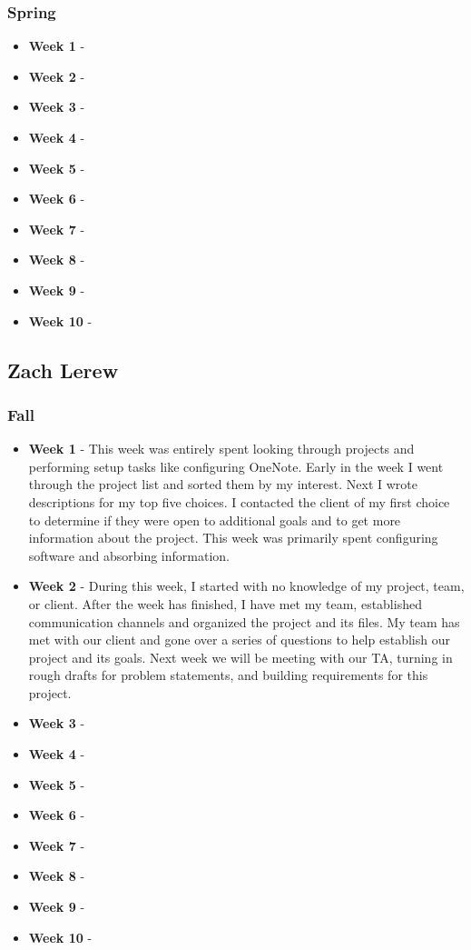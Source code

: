 \documentclass[onecolumn, draftclsnofoot,10pt, compsoc]{IEEEtran}
\begin{document}
			\subsubsection{Spring}
				\begin{itemize}
					\item \textbf{Week 1} - 
					\item \textbf{Week 2} - 
					\item \textbf{Week 3} - 
					\item \textbf{Week 4} - 
					\item \textbf{Week 5} - 
					\item \textbf{Week 6} - 
					\item \textbf{Week 7} - 
					\item \textbf{Week 8} - 
					\item \textbf{Week 9} - 
					\item \textbf{Week 10} - 
				\end{itemize}
		\subsection{Zach Lerew}
			\subsubsection{Fall}
				\begin{itemize}
					\item \textbf{Week 1} - This week was entirely spent looking through projects and performing setup tasks like configuring OneNote. Early in the week I went through the project list and sorted them by my interest. Next I wrote descriptions for my top five choices. I contacted the client of my first choice to determine if they were open to additional goals and to get more information about the project. This week was primarily spent configuring software and absorbing information. 
					\item \textbf{Week 2} - During this week, I started with no knowledge of my project, team, or client. After the week has finished, I have met my team, established communication channels and organized the project and its files. My team has met with our client and gone over a series of questions to help establish our project and its goals. Next week we will be meeting with our TA, turning in rough drafts for problem statements, and building requirements for this project. 
					\item \textbf{Week 3} - 
					\item \textbf{Week 4} - 
					\item \textbf{Week 5} - 
					\item \textbf{Week 6} - 
					\item \textbf{Week 7} - 
					\item \textbf{Week 8} - 
					\item \textbf{Week 9} - 
					\item \textbf{Week 10} - 
				\end{itemize}
\end{document}
